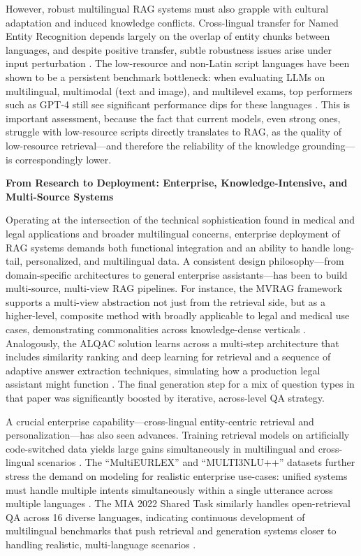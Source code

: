 \documentclass[11pt]{article}
\begin{document}
However, robust multilingual RAG systems must also grapple with cultural adaptation and induced knowledge conflicts. Cross-lingual transfer for Named Entity Recognition depends largely on the overlap of entity chunks between languages, and despite positive transfer, subtle robustness issues arise under input perturbation \cite{ref189}. The low-resource and non-Latin script languages have been shown to be a persistent benchmark bottleneck: when evaluating LLMs on multilingual, multimodal (text and image), and multilevel exams, top performers such as GPT-4 still see significant performance dips for these languages \cite{ref190}. This is important assessment, because the fact that current models, even strong ones, struggle with low-resource scripts directly translates to RAG, as the quality of low-resource retrieval---and therefore the reliability of the knowledge grounding---is correspondingly lower.

\textbf{From Research to Deployment: Enterprise, Knowledge-Intensive, and Multi-Source Systems}

Operating at the intersection of the technical sophistication found in medical and legal applications and broader multilingual concerns, enterprise deployment of RAG systems demands both functional integration and an ability to handle long-tail, personalized, and multilingual data. A consistent design philosophy---from domain-specific architectures to general enterprise assistants---has been to build multi-source, multi-view RAG pipelines. For instance, the MVRAG framework supports a multi-view abstraction not just from the retrieval side, but as a higher-level, composite method with broadly applicable to legal and medical use cases, demonstrating commonalities across knowledge-dense verticals \cite{ref182}. Analogously, the ALQAC solution learns across a multi-step architecture that includes similarity ranking and deep learning for retrieval and a sequence of adaptive answer extraction techniques, simulating how a production legal assistant might function \cite{ref184}. The final generation step for a mix of question types in that paper was significantly boosted by iterative, across-level QA strategy.

A crucial enterprise capability---cross-lingual entity-centric retrieval and personalization---has also seen advances. Training retrieval models on artificially code-switched data yields large gains simultaneously in multilingual and cross-lingual scenarios \cite{ref191}. The ``MultiEURLEX'' and ``MULTI3NLU++'' datasets further stress the demand on modeling for realistic enterprise use-cases: unified systems must handle multiple intents simultaneously within a single utterance across multiple languages \cite{ref186,ref192}. The MIA 2022 Shared Task similarly handles open-retrieval QA across 16 diverse languages, indicating continuous development of multilingual benchmarks that push retrieval and generation systems closer to handling realistic, multi-language scenarios \cite{ref193}.
\end{document}
